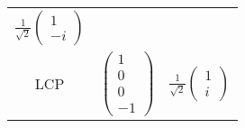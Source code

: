 \documentclass{article}
\begin{document}
\begin{tabular}{c c c}
        $\frac{1}{\sqrt{2}}\begin{pmatrix} 1 \\ -i \end{pmatrix}$  \\
        \addlinespace[1.5ex]
        LCP & 
        $\begin{pmatrix} 1 \\ 0 \\ 0 \\ -1 \end{pmatrix}$ & 
        $\frac{1}{\sqrt{2}}\begin{pmatrix} 1 \\ i \end{pmatrix}$  \\
        \bottomrule
    \end{tabular}
\end{document}
